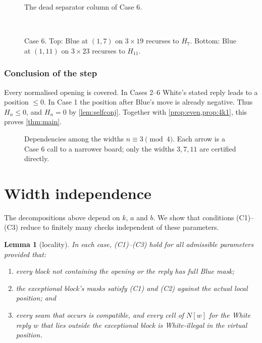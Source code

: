 \documentclass[11pt]{amsart}
\newtheorem{lemma}[theorem]{Lemma}
\theoremstyle{definition}
\newcommand{\Nb}{N}
\begin{document}
\begin{figure}[ht]
\centering
{}
\caption{The dead separator column of Case 6.}
\label{fig:deadzoom}
\end{figure}

\begin{figure}[ht]
\centering
{}\\[6pt]
\caption{Case 6. Top: Blue at $(1,7)$ on $3\times19$ recurses to $H_7$.
Bottom: Blue at $(1,11)$ on $3\times23$ recurses to $H_{11}$.}
\label{fig:case6}
\end{figure}

\subsubsection*{Conclusion of the step}
Every normalised opening is covered. In Cases 2--6 White's stated reply leads
to a position $\le0$. In Case 1 the position after Blue's move is already
negative. Thus $H_n\le0$, and $H_n=0$ by \cref{lem:selfconj}. Together with
\cref{prop:even,prop:4k1}, this proves \cref{thm:main}.

\begin{figure}[ht]
\centering
{}
\caption{Dependencies among the widths $n\equiv3\pmod4$. Each arrow is a
Case 6 call to a narrower board; only the widths $3,7,11$ are certified
directly.}
\label{fig:recursion}
\end{figure}

\section{Width independence}\label{sec:locality}

The decompositions above depend on $k$, $a$ and $b$. We show that
conditions (C1)--(C3) reduce to finitely many checks independent of these
parameters.

\begin{lemma}[locality]\label{lem:locality}
In each case, (C1)--(C3) hold for all admissible parameters provided that:
\begin{enumerate}[label=(\roman*)]
\item every block not containing the opening or the reply has full Blue mask;
\item the exceptional block's masks satisfy (C1) and (C2) against the actual
local position; and
\item every seam that occurs is compatible, and every cell of $\Nb[w]$ for
the White reply $w$ that lies outside the exceptional block is White-illegal
in the virtual position.
\end{enumerate}
\end{lemma}
\end{document}
